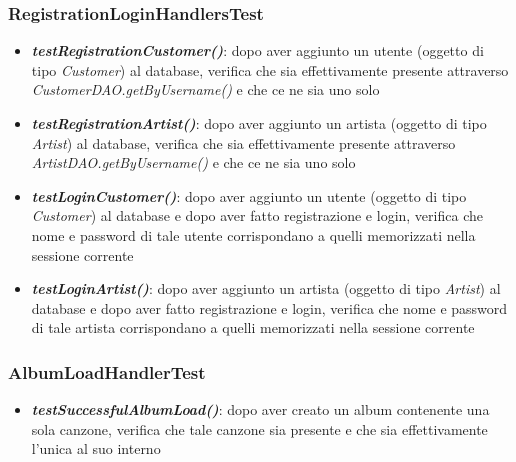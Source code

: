 \documentclass{article}
\begin{document}
  \subsubsection{RegistrationLoginHandlersTest}
  \begin{itemize}
    \item \textbf{\textit{testRegistrationCustomer()}}:
    dopo aver aggiunto un utente (oggetto di tipo \textit{Customer}) al database, verifica che sia effettivamente presente attraverso \textit{CustomerDAO.getByUsername()} e che ce ne sia uno solo

    \item \textbf{\textit{testRegistrationArtist()}}:
    dopo aver aggiunto un artista (oggetto di tipo \textit{Artist}) al database, verifica che sia effettivamente presente attraverso \textit{ArtistDAO.getByUsername()} e che ce ne sia uno solo

    \item \textbf{\textit{testLoginCustomer()}}: dopo aver aggiunto un utente (oggetto di tipo \textit{Customer}) al database e dopo aver fatto registrazione e login, verifica che nome e password di tale utente corrispondano a quelli memorizzati nella sessione corrente

    \item \textbf{\textit{testLoginArtist()}}: dopo aver aggiunto un artista (oggetto di tipo \textit{Artist}) al database e dopo aver fatto registrazione e login, verifica che nome e password di tale artista corrispondano a quelli memorizzati nella sessione corrente

  \end{itemize}

  \subsubsection{AlbumLoadHandlerTest}
  \begin{itemize}
    \item \textbf{\textit{testSuccessfulAlbumLoad()}}: dopo aver creato un album contenente una sola canzone, verifica che tale canzone sia presente e che sia effettivamente l'unica al suo interno
  \end{itemize}
\end{document}
